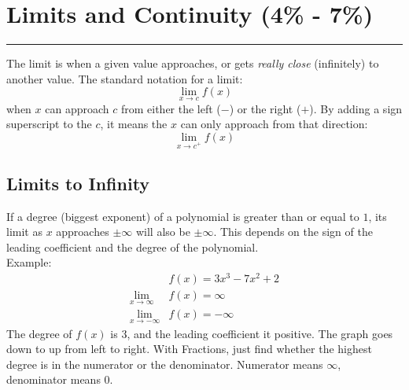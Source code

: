 \documentclass[12pt]{article}
\begin{document}
    \section{Limits and Continuity (4\% - 7\%)}
    \par\noindent\rule{\textwidth}{0.1pt}
        The limit is when a given value approaches, or gets \textit{really close} (infinitely) to another value. The standard notation for a limit:
        \[ \lim_{x \to c} f(x) \]
        when $x$ can approach $c$ from either the left ($-$) or the right ($+$). By adding a sign superscript to the $c$, it means the $x$ can only approach from that direction:
        \[ \lim_{x \to c^+} f(x) \]

        \raggedright
        \subsection{Limits to Infinity}
            If a degree (biggest exponent) of a polynomial is greater than or equal to $1$, its limit as $x$ approaches $\pm\infty$ will also be $\pm\infty$. This depends on the sign of the leading coefficient and the degree of the polynomial.
            \\ Example:
            \begin{align*}
                &f(x) = 3x^3 - 7x^2 + 2 \\
                \lim_{x \to \infty} &f(x) = \infty \\
                \lim_{x \to -\infty} &f(x) = -\infty
            \end{align*}
            The degree of $f(x)$ is $3$, and the leading coefficient it positive. The graph goes down to up from left to right.
            \newline \newline
            With Fractions, just find whether the highest degree is in the numerator or the denominator. Numerator means $\infty$, denominator means $0$.
\end{document}

